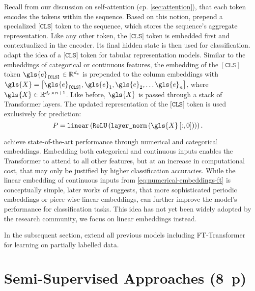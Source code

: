 Recall from our discussion on self-attention (cp. \cref{sec:attention}), that each token encodes the tokens within the sequence. Based on this notion, \textcite[][4174]{devlinBERTPretrainingDeep2019} prepend a specialized $\texttt{[CLS]}$ token to the sequence, which stores the sequence's aggregate representation. Like any other token, the $\texttt{[CLS]}$ token is embedded first and contextualized in the encoder. Its final hidden state is then used for classification. \textcite[][4]{gorishniyRevisitingDeepLearning2021} adapt the idea of a $\texttt{[CLS]}$ token for tabular representation models. Similar to the embeddings of categorical or continuous features, the embedding of the $[\texttt{CLS}]$ token $\gls{e}_\texttt{[CLS]} \in \mathbb{R}^{d_{e}}$ is prepended to the column embeddings with $\gls{X} = \left[\gls{e}_\texttt{[CLS]}, \gls{e}_1, \gls{e}_2, \ldots \gls{e}_{n}\right]$, where $\gls{X} \in \mathbb{R}^{d_{e} \times n +1}$. Like before, $\gls{X}$ is passed through a stack of Transformer layers. The updated representation of the $\texttt{[CLS]}$ token is used exclusively for prediction:
\begin{equation}
P=\texttt{linear}\left(\texttt{ReLU}\left(\texttt{layer\_norm}\left(\gls{X}\left[:,0\right]\right)\right)\right).
\label{eq:bert-ft}
\end{equation}

\textcite[][8]{gorishniyRevisitingDeepLearning2021} achieve state-of-the-art performance through numerical and categorical embeddings. Embedding both categorical and continuous inputs enables the Transformer to attend to all other features, but at an increase in computational cost, that may only be justified by higher classification accuracies. While the linear embedding of continuous inputs from \cref{eq:numerical-embeddings-ft} is conceptually simple, later works of \textcite[][8]{gorishniyEmbeddingsNumericalFeatures2022} suggests, that more sophisticated periodic embeddings or piece-wise-linear embeddings, can further improve the model's performance for classification tasks. This idea has not yet been widely adopted by the research community, we focus on linear embeddings instead.

In the subsequent section, extend all previous models including FT-Transformer for learning on partially labelled data.

\newpage
\section{Semi-Supervised Approaches (8~p)}\label{sec:semi-supervised-approaches}

